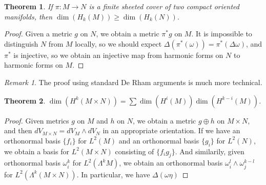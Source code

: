 \documentclass{article}
\theoremstyle{plain}
\newtheorem{theorem}{Theorem}
\theoremstyle{remark}
\newtheorem*{remark}{Remark}
\theoremstyle{definition}
\begin{document}
\begin{theorem}
    If $\pi: M \to N$ is a finite sheeted cover of two compact oriented manifolds, then $\dim(H_k(M)) \geq \dim(H_k(N))$.
\end{theorem}
\begin{proof}
    Given a metric $g$ on $N$, we obtain a metric $\pi^* g$ on $M$. It is impossible to distinguish $N$ from $M$ locally, so we should expect $\Delta(\pi^*(\omega)) = \pi^*(\Delta \omega)$, and $\pi^*$ is injective, so we obtain an injective map from harmonic forms on $N$ to harmonic forms on $M$.
\end{proof}

\begin{remark}
    The proof using standard De Rham arguments is much more technical.
\end{remark}

\begin{theorem}
    $\dim(H^k(M \times N)) = \sum \dim(H^i(M)) \dim(H^{k-i}(M))$.
\end{theorem}
\begin{proof}
    Given metrics $g$ on $M$ and $h$ on $N$, we obtain a metric $g \oplus h$ on $M \times N$, and then $dV_{M \times N} = dV_M \wedge dV_N$ in an appropriate orientation. If we have an orthonormal basis $\{ f_i \}$ for $L^2(M)$ and an orthonormal basis $\{ g_i \}$ for $L^2(N)$, we obtain a basis for $L^2(M \times N)$ consisting of $\{ f_ig_j \}$. And similarily, given orthonormal basis $\omega_i^k$ for $L^2(\Lambda^k M)$, we obtain an orthonormal basis $\omega_i^l \wedge \omega_j^{k-l}$ for $L^2(\Lambda^k(M \times N))$. In particular, we have $\Delta(\omega \eta)$
\end{proof}
\end{document}
